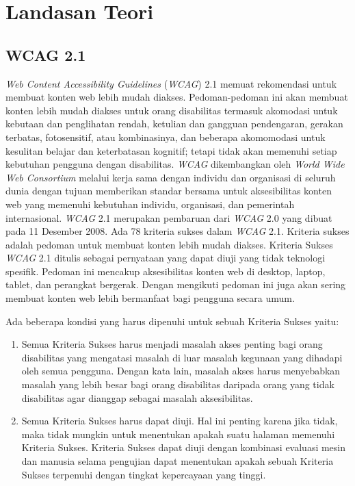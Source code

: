 \chapter{Landasan Teori}
\label{chap:teori}


\section{WCAG 2.1}
\label{sec:WCAG2.1} 
\textit{Web Content Accessibility Guidelines} (\textit{WCAG}) 2.1 memuat rekomendasi untuk membuat konten web lebih mudah diakses. Pedoman-pedoman ini akan membuat konten lebih mudah diakses untuk orang disabilitas termasuk akomodasi untuk kebutaan dan penglihatan rendah, ketulian dan gangguan pendengaran, gerakan terbatas, fotosensitif, atau kombinasinya, dan beberapa akomomodasi untuk kesulitan belajar dan keterbatasan kognitif; tetapi tidak akan memenuhi setiap kebutuhan pengguna dengan disabilitas. \textit{WCAG} dikembangkan oleh \textit{World Wide Web Consortium} melalui kerja sama dengan individu dan organisasi di seluruh dunia dengan tujuan memberikan standar bersama untuk aksesibilitas konten web yang memenuhi kebutuhan individu, organisasi, dan pemerintah internasional. \textit{WCAG} 2.1 merupakan pembaruan dari \textit{WCAG} 2.0 yang dibuat pada 11 Desember 2008. Ada 78 kriteria sukses dalam \textit{WCAG} 2.1. Kriteria sukses adalah pedoman untuk membuat konten lebih mudah diakses. Kriteria Sukses \textit{WCAG} 2.1 ditulis sebagai pernyataan yang dapat diuji yang tidak teknologi spesifik. Pedoman ini mencakup aksesibilitas konten web di desktop, laptop, tablet, dan perangkat bergerak. Dengan mengikuti pedoman ini juga akan sering membuat konten web lebih bermanfaat bagi pengguna secara umum.

Ada beberapa kondisi yang harus dipenuhi untuk sebuah Kriteria Sukses yaitu:

\begin{enumerate}
	\item Semua Kriteria Sukses harus menjadi masalah akses penting bagi orang disabilitas yang mengatasi masalah di luar masalah kegunaan yang dihadapi oleh semua pengguna. Dengan kata lain, masalah akses harus menyebabkan masalah yang lebih besar bagi orang disabilitas daripada orang yang tidak disabilitas agar dianggap sebagai masalah aksesibilitas.
	\item Semua Kriteria Sukses harus dapat diuji. Hal ini penting karena jika tidak, maka tidak mungkin untuk menentukan apakah suatu halaman memenuhi Kriteria Sukses. Kriteria Sukses dapat diuji dengan kombinasi evaluasi mesin dan manusia selama pengujian dapat menentukan apakah sebuah Kriteria Sukses terpenuhi dengan tingkat kepercayaan yang tinggi.
\end{enumerate}

